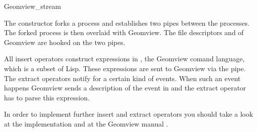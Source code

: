\begin{ccClass}{Geomview_stream}
\begin{ccAdvanced}
\end{ccAdvanced}


\ccImplementation

The constructor forks a process and establishes two pipes between the
processes. The forked process is then overlaid with Geomview. The
file descriptors  and  of Geomview are hooked
on the two pipes.

All insert operators construct expressions in , the Geomview
comand language, which is a subset of {\sc Lisp}. These expressions
are sent to Geomview via the pipe. The extract operators notify 
for a certain kind of events. When such an event happens Geomview
sends a description of the event in  and the extract operator has
to parse this expression.

In order to implement further insert and extract operators you should
take a look at the implementation \cite{f-higso-97} and at the Geomview
manual \cite{p-gmgv16-96}.
\end{ccClass}

